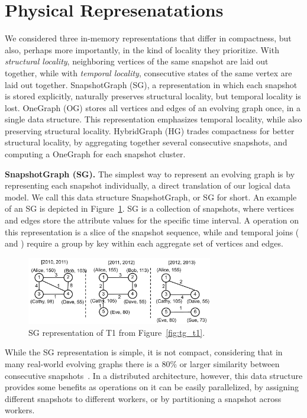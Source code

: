 \section{Physical Represenatations}
\label{sec:physical}

We considered three in-memory \tg representations that differ in
compactness, but also, perhaps more importantly, in the kind of
locality they prioritize. With {\em structural locality}, neighboring
vertices of the same snapshot are laid out together, while with {\em
  temporal locality}, consecutive states of the same vertex are laid
out together.  SnapshotGraph (SG), a representation in which each
snapshot is stored explicitly, naturally preserves structural
locality, but temporal locality is lost. OneGraph (OG) stores all
vertices and edges of an evolving graph once, in a single data
structure.  This representation emphasizes temporal locality, while
also preserving structural locality.  HybridGraph (HG) trades
compactness for better structural locality, by aggregating together
several consecutive snapshots, and computing a OneGraph for each
snapshot cluster.

{\bf SnapshotGraph (SG).} The simplest way to represent an evolving
graph is by representing each snapshot individually, a direct
translation of our logical data model.  We call this data structure
SnapshotGraph, or SG for short. An example of an SG is depicted in
Figure~\ref{fig:sgp}.  SG is a collection of snapshots, where vertices
and edges store the attribute values for the specific time interval.
A  operation on this representation is a slice of the
snapshot sequence, while  and temporal joins
( and ) require a group by key within each
aggregate set of vertices and edges.

\begin{figure}[t!]
\includegraphics[width=3.2in]{figs/sgp.pdf}
\caption{SG representation of T1 from Figure~\ref{fig:tg_t1}.}
\label{fig:sgp}
\end{figure}

While the SG representation is simple, it is not compact, considering
that in many real-world evolving graphs there is a 80\% or larger
similarity between consecutive
snapshots~\cite{DBLP:journals/tos/MiaoHLWYZPCC15}.  In a distributed
architecture, however, this data structure provides some benefits as
operations on it can be easily parallelized, by assigning different
snapshots to different workers, or by partitioning a snapshot across
workers.  

